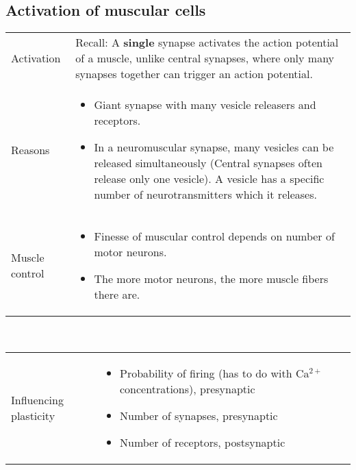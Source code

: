 \subsection{Activation of muscular cells}
\begin{tabular}{p{4cm}p{15cm}}
Activation	& Recall: A \textbf{single} synapse activates the action potential of a muscle, unlike central synapses, where only many synapses together can trigger an action potential.\\
Reasons		& \begin{itemize}
       		  	\item Giant synapse with many vesicle releasers and receptors. 
			\item In a neuromuscular synapse, many vesicles can be released simultaneously (Central synapses often release only one vesicle). A vesicle has a specific number of neurotransmitters which it releases.
       		  \end{itemize}\\
Muscle control	& \begin{itemize}
			\item Finesse of muscular control depends on number of motor neurons.
			\item The more motor neurons, the more muscle fibers there are.
              	  \end{itemize}\\
\end{tabular}\\
\begin{tabular}{p{4cm}p{15cm}}
Influencing plasticity	& \begin{itemize}
          	  	\item Probability of firing (has to do with Ca$^{2+}$ concentrations), presynaptic
			\item Number of synapses, presynaptic
			\item Number of receptors, postsynaptic
          	  \end{itemize}
\end{tabular}